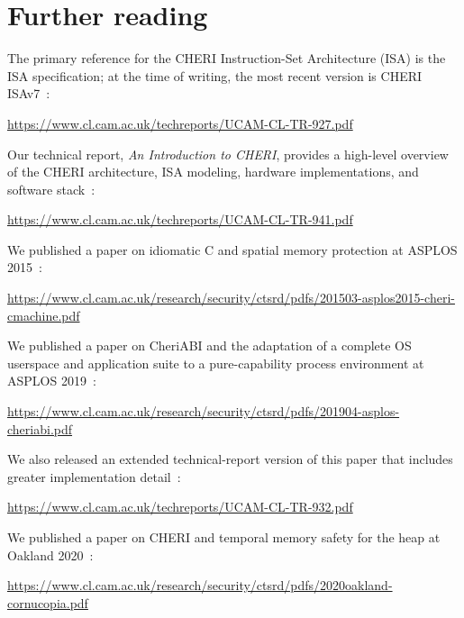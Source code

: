 \documentclass[12pt,twoside,openright,a4paper]{article}
\newcommand{\note}[2]{{\color{blue}[ Note: #1 - #2]}}
\renewcommand{\note}[2]{\relax\ifhmode\unskip\fi}
\newcommand{\arnote}[1]{\note{#1}{Alex R.}}
\begin{document}
\arnote{\subsection{TODO: more warnings}}


\section{Further reading}
\label{sec:further_reading}

The primary reference for the CHERI Instruction-Set Architecture (ISA) is the
ISA specification; at the time of writing, the most recent version is CHERI
ISAv7~\cite{UCAM-CL-TR-927}:

\smallskip
\noindent
\url{https://www.cl.cam.ac.uk/techreports/UCAM-CL-TR-927.pdf}
\smallskip

\noindent
Our technical report, \textit{An Introduction to CHERI}, provides a high-level
overview of the CHERI architecture, ISA modeling, hardware implementations,
and software stack~\cite{UCAM-CL-TR-941}:

\smallskip
\noindent
\url{https://www.cl.cam.ac.uk/techreports/UCAM-CL-TR-941.pdf}
\smallskip

\noindent
We published a paper on idiomatic C and spatial memory protection at ASPLOS
2015~\cite{ChisnallCPDP11}:

\smallskip
\noindent
\url{https://www.cl.cam.ac.uk/research/security/ctsrd/pdfs/201503-asplos2015-cheri-cmachine.pdf}
\smallskip

\noindent
We published a paper on CheriABI and the adaptation of a complete OS userspace
and application suite to a pure-capability process environment at ASPLOS
2019~\cite{davis2019:cheriabi}:

\smallskip
\noindent
\url{https://www.cl.cam.ac.uk/research/security/ctsrd/pdfs/201904-asplos-cheriabi.pdf}
\smallskip

\noindent
We also released an extended technical-report version of this paper that
includes greater implementation detail~\cite{UCAM-CL-TR-932}:

\smallskip
\noindent
\url{https://www.cl.cam.ac.uk/techreports/UCAM-CL-TR-932.pdf}
\smallskip

\noindent
We published a paper on CHERI and temporal memory safety for the heap at
Oakland 2020~\cite{filardo:cornucopia}:

\smallskip
\noindent
\url{https://www.cl.cam.ac.uk/research/security/ctsrd/pdfs/2020oakland-cornucopia.pdf}
\smallskip
\end{document}
